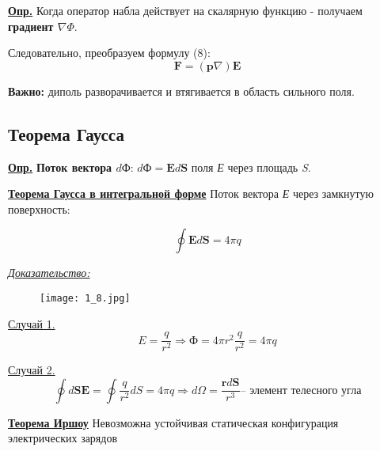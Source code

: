 \colorbox{faded}{\underline{\textbf{Опр.}}} Когда оператор набла действует на скалярную функцию - получаем \textbf{градиент $\nabla \Phi$}.

Следовательно, преобразуем формулу (8):
\begin{equation}\label{opr10}
\mathbf{F} = (\mathbf{p} \nabla) \mathbf{E}
\end{equation}

\textbf{Важно:} диполь разворачивается и втягивается в область сильного поля.

\subsection{Теорема Гаусса}

\colorbox{faded}{\underline{\textbf{Опр.}}} \textbf{Поток вектора $d \text{Ф}$}: $d \text{Ф} = \mathbf{E} d \mathbf{S}$ поля \textit{Е} через площадь \textit{S}.

\colorbox{faded}{\underline{\textbf{Теорема Гаусса в интегральной форме}}} Поток вектора \textit{Е} через замкнутую поверхность:

\begin{equation}\label{opr10}
  \oint \mathbf{E} d \mathbf{S} = 4 \pi q
\end{equation}

\underline{\textit{Доказательство:}}

\begin{figure}[!ht]
\centering
 \texttt{[image: 1\_8.jpg]}     
 \label{fig:my_label}
 \caption{}
\end{figure}

\underline{Случай 1.} 
$$E = \frac{q}{r^2} \Rightarrow \text{Ф} = 4 \pi r^2 \frac{q}{r^2} = 4 \pi q$$

\underline{Случай 2.} 
$$\oint d \mathbf{S} \mathbf{E} = \oint \frac{q}{r^2}  d S = 4 \pi q
\Rightarrow d \Omega = \frac{\mathbf{r} d \mathbf{S}}{r^3} \text{-- элемент телесного угла}$$

\colorbox{faded}{\underline{\textbf{Теорема Иршоу}}} Невозможна устойчивая статическая конфигурация электрических зарядов
